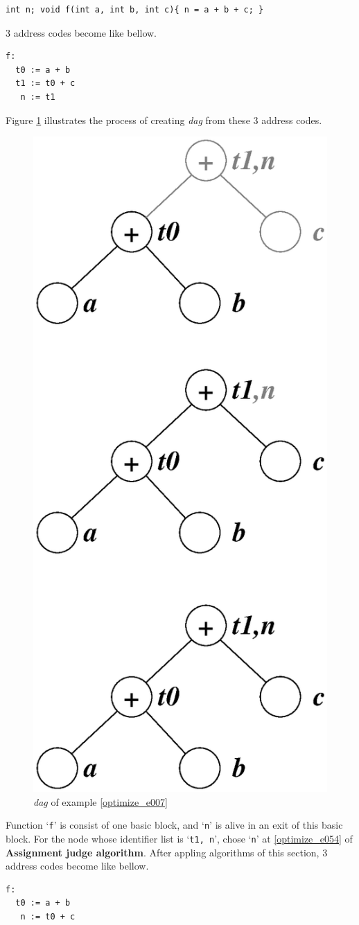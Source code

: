 \begin{Example}
\label{optimize_e007}
\begin{verbatim}
int n; void f(int a, int b, int c){ n = a + b + c; }
\end{verbatim}
3 address codes become like bellow.
\begin{verbatim}
f:
  t0 := a + b
  t1 := t0 + c
   n := t1
\end{verbatim}
Figure \ref{optimize_e008} illustrates the process of creating
{\em dag} from these 3 address codes.
\begin{figure}[htbp]
\begin{center}
\includegraphics[width=0.468\linewidth,height=1.0\linewidth]{opt001.eps}
\caption{{\em dag} of example \ref{optimize_e007}}
\label{optimize_e008}
\end{center}
\end{figure}
Function `{\tt{f}}' is consist of one basic block, and 
`{\tt{n}}' is alive in an exit of this basic block.
For the node whose identifier list is `{\tt{t1, n}}',
chose `{\tt{n}}' at \ref{optimize_e054} of {\bf Assignment judge algorithm}.
After appling algorithms of this section,
3 address codes become like bellow.
\begin{verbatim}
f:
  t0 := a + b
   n := t0 + c
\end{verbatim}
\end{Example}

